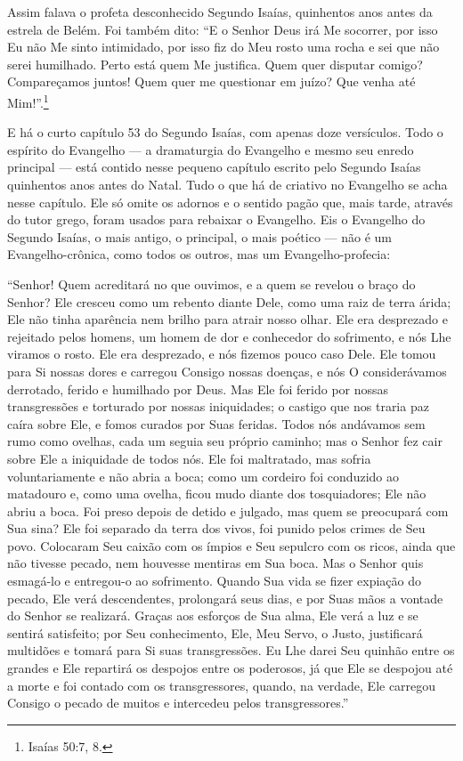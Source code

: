 Assim falava o profeta desconhecido Segundo Isaías, quinhentos anos
antes da estrela de Belém. Foi também dito: ``E o Senhor Deus irá Me
socorrer, por isso Eu não Me sinto intimidado, por isso fiz do Meu rosto
uma rocha e sei que não serei humilhado. Perto está quem Me justifica.
Quem quer disputar comigo? Compareçamos juntos! Quem quer me questionar
em juízo? Que venha até Mim!''.\footnote{Isaías 50:7, 8.}

E há o curto capítulo 53 do Segundo Isaías, com apenas doze versículos.
Todo o espírito do Evangelho --- a dramaturgia do Evangelho e mesmo seu
enredo principal --- está contido nesse pequeno capítulo escrito pelo
Segundo Isaías quinhentos anos antes do Natal. Tudo o que há de criativo
no Evangelho se acha nesse capítulo. Ele só omite os adornos e o sentido
pagão que, mais tarde, através do tutor grego, foram usados para
rebaixar o Evangelho. Eis o Evangelho do Segundo Isaías, o mais antigo,
o principal, o mais poético --- não é um Evangelho-crônica, como todos
os outros, mas um Evangelho-profecia:

``Senhor! Quem acreditará no que ouvimos, e a quem se revelou o braço do
Senhor? Ele cresceu como um rebento diante Dele, como uma raiz de terra
árida; Ele não tinha aparência nem brilho para atrair nosso olhar. Ele
era desprezado e rejeitado pelos homens, um homem de dor e conhecedor do
sofrimento, e nós Lhe viramos o rosto. Ele era desprezado, e nós fizemos
pouco caso Dele. Ele tomou para Si nossas dores e carregou Consigo
nossas doenças, e nós O considerávamos derrotado, ferido e humilhado por
Deus. Mas Ele foi ferido por nossas transgressões e torturado por nossas
iniquidades; o castigo que nos traria paz caíra sobre Ele, e fomos
curados por Suas feridas. Todos nós andávamos sem rumo como ovelhas,
cada um seguia seu próprio caminho; mas o Senhor fez cair sobre Ele a
iniquidade de todos nós. Ele foi maltratado, mas sofria voluntariamente
e não abria a boca; como um cordeiro foi conduzido ao matadouro e, como
uma ovelha, ficou mudo diante dos tosquiadores; Ele não abriu a boca.
Foi preso depois de detido e julgado, mas quem se preocupará com Sua
sina? Ele foi separado da terra dos vivos, foi punido pelos crimes de
Seu povo. Colocaram Seu caixão com os ímpios e Seu sepulcro com os
ricos, ainda que não tivesse pecado, nem houvesse mentiras em Sua boca.
Mas o Senhor quis esmagá-lo e entregou-o ao sofrimento. Quando Sua vida
se fizer expiação do pecado, Ele verá descendentes, prolongará seus
dias, e por Suas mãos a vontade do Senhor se realizará. Graças aos
esforços de Sua alma, Ele verá a luz e se sentirá satisfeito; por Seu
conhecimento, Ele, Meu Servo, o Justo, justificará multidões e tomará
para Si suas transgressões. Eu Lhe darei Seu quinhão entre os grandes e
Ele repartirá os despojos entre os poderosos, já que Ele se despojou até
a morte e foi contado com os transgressores, quando, na verdade, Ele
carregou Consigo o pecado de muitos e intercedeu pelos transgressores.''

